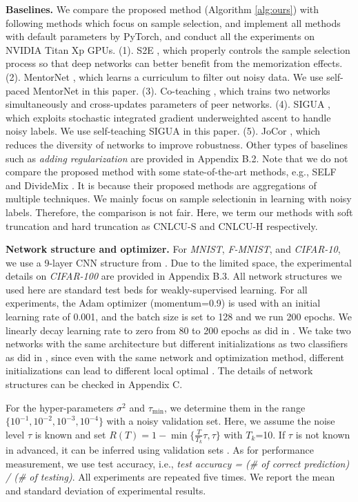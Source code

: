 \documentclass[11pt]{article}
\begin{document}
\textbf{Baselines.} We compare the proposed method (Algorithm \ref{alg:ours}) with following methods which focus on sample selection, and implement all methods with default parameters by PyTorch, and conduct all the experiments on NVIDIA Titan Xp GPUs. (1). S2E \citep{yao2020searching}, which properly controls the sample selection process so that deep networks can better benefit from the memorization effects. (2). MentorNet \citep{jiang2018mentornet}, which learns a curriculum to filter out noisy data. We use self-paced MentorNet in this paper. (3). Co-teaching \citep{han2018co}, which trains two networks simultaneously and cross-updates parameters of peer networks. (4). SIGUA \citep{han2020sigua}, which exploits stochastic integrated gradient underweighted ascent to handle noisy labels. We use self-teaching SIGUA in this paper. (5). JoCor \citep{wei2020combating}, which reduces the diversity of networks to improve robustness. Other types of baselines such as \textit{adding regularization} are provided in Appendix B.2. Note that we do not compare the proposed method with some state-of-the-art methods, e.g., SELF \citep{nguyen2020self} and DivideMix \citep{li2020dividemix}. It is because their proposed methods are aggregations of multiple techniques. We mainly focus on sample selectionin in learning with noisy labels. Therefore, the comparison is not fair. Here, we term our methods with soft truncation and hard truncation as CNLCU-S and CNLCU-H respectively.


\textbf{Network structure and optimizer.} For \textit{MNIST}, \textit{F-MNIST}, and \textit{CIFAR-10}, we use a 9-layer CNN structure from \citep{han2018co}. Due to the limited space, the experimental details on \textit{CIFAR-100} are provided in Appendix B.3. All network structures we used here are standard test beds for weakly-supervised learning. For all experiments, the Adam optimizer \citep{kingma2014adam} (momentum=0.9) is used with an initial learning rate of 0.001, and the batch size is set to 128 and we run 200 epochs.  We linearly decay learning rate to zero from 80 to 200 epochs as did in \citep{han2018co}. We take two networks with the same architecture but different initializations as two classifiers as did in \citep{han2018co,yu2019does,wei2020combating}, since even with the same network and optimization method, different initializations can lead to different local optimal \citep{han2018co}. The details of network structures can be checked in Appendix C.

For the hyper-parameters $\sigma^2$ and $\tau_{\min}$, we determine them in the range $\{10^{-1},10^{-2},10^{-3},10^{-4}\}$ with a noisy validation set. Here, we assume the noise level $\tau$ is known and set $R(T)=1-\min\{\frac{T}{T_k}\tau,\tau\}$ with $T_k$=10. If $\tau$ is not known in advanced, it can be inferred using validation sets \citep{liu2016classification,yu2018efficient}. As for performance measurement, we use test accuracy, i.e., \textit{test accuracy = (\# of correct prediction) / (\# of testing)}. All experiments are repeated five times. We report the mean and standard deviation of experimental results. 
\end{document}
